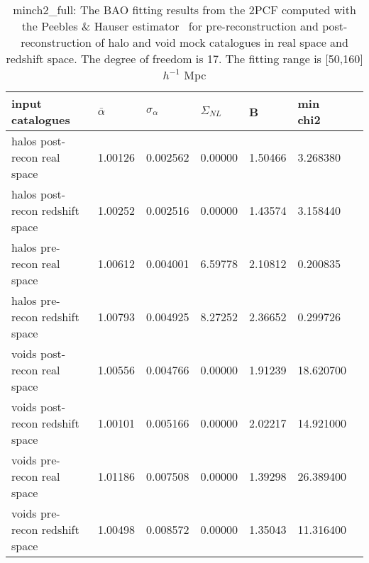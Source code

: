 \begin{table*}
\caption{minch2\_full: The BAO fitting results from the 2PCF computed with the Peebles \& Hauser estimator~\cite{Peebles1974} for pre-reconstruction and  post-reconstruction of halo and void mock catalogues in real space and redshift space. The degree of freedom is 17. The fitting range is [50,160] $h^{-1}$ Mpc}
\label{tab:LS}
\begin{tabular}{lllllll}
\hline
input catalogues                &$\bar{\alpha}$&$\sigma_{\alpha}$&     $\Sigma_{NL}$ &        B &  min chi2 \\
\hline
halos post-recon real space     & 1.00126 & 0.002562 & 0.00000 & 1.50466 & 3.268380  \\
halos post-recon redshift space & 1.00252 & 0.002516 & 0.00000 & 1.43574 & 3.158440  \\
halos pre-recon real space      & 1.00612 & 0.004001 & 6.59778 & 2.10812 & 0.200835  \\
halos pre-recon redshift space  & 1.00793 & 0.004925 & 8.27252 & 2.36652 & 0.299726  \\
\hline
voids post-recon real space     & 1.00556 & 0.004766 & 0.00000 & 1.91239 & 18.620700 \\
voids post-recon redshift space & 1.00101 & 0.005166 & 0.00000 & 2.02217 & 14.921000 \\
voids pre-recon real space      & 1.01186 & 0.007508 & 0.00000 & 1.39298 & 26.389400 \\
voids pre-recon redshift space  & 1.00498 & 0.008572 & 0.00000 & 1.35043 & 11.316400 \\
\hline
\end{tabular}
\end{table*}

